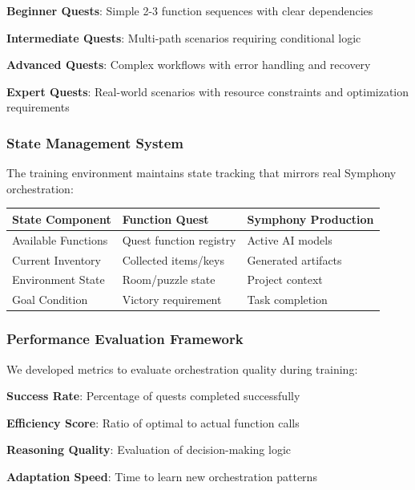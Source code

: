 \begin{compactlist}
    \item \textbf{Beginner Quests}: Simple 2-3 function sequences with clear dependencies
    \item \textbf{Intermediate Quests}: Multi-path scenarios requiring conditional logic
    \item \textbf{Advanced Quests}: Complex workflows with error handling and recovery
    \item \textbf{Expert Quests}: Real-world scenarios with resource constraints and optimization requirements
\end{compactlist}

\subsubsection*{State Management System}

The training environment maintains state tracking that mirrors real Symphony orchestration:

\begin{center}
\begin{tabular}{@{}lll@{}}
\toprule
\textbf{State Component} & \textbf{Function Quest} & \textbf{Symphony Production} \\
\midrule
Available Functions & Quest function registry & Active AI models \\
Current Inventory & Collected items/keys & Generated artifacts \\
Environment State & Room/puzzle state & Project context \\
Goal Condition & Victory requirement & Task completion \\
\bottomrule
\end{tabular}
\end{center}

\subsubsection*{Performance Evaluation Framework}

We developed metrics to evaluate orchestration quality during training:

\begin{expandedlist}
    \item \textbf{Success Rate}: Percentage of quests completed successfully
    \item \textbf{Efficiency Score}: Ratio of optimal to actual function calls
    \item \textbf{Reasoning Quality}: Evaluation of decision-making logic
    \item \textbf{Adaptation Speed}: Time to learn new orchestration patterns
\end{expandedlist}

